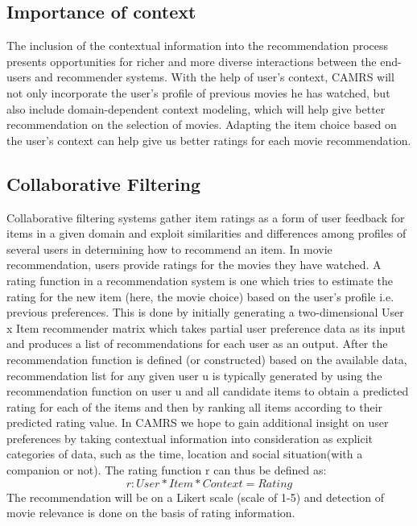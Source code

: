 \documentclass{article}
\begin{document}
\subsection{Importance of context} 
The inclusion of the contextual information into the recommendation process presents opportunities for richer and more diverse interactions between the end-users and recommender systems. With the help of user's context, CAMRS will not only incorporate the user's profile of previous movies he has watched, but also include domain-dependent context modeling, which will help give better recommendation on the selection of movies.  Adapting the item choice based on the user's context can help give us better ratings for each movie recommendation.

\subsection{Collaborative Filtering}
Collaborative filtering systems gather item ratings as a form of user feedback for items in a given domain and exploit similarities and differences among profiles of several users in determining how to recommend an item. In movie recommendation, users provide ratings for the movies they have watched. 
A rating function in a recommendation system is one which tries to estimate the rating for the new item (here, the movie choice) based on the user's profile i.e. previous preferences.
This is done by initially generating a two-dimensional User x Item recommender matrix which takes partial user preference data as its input and produces a list of recommendations for each user as an output.
After the recommendation function is defined (or constructed) based on the available data, recommendation list for any given user u is typically generated by using the recommendation function on user u and all candidate items to obtain a predicted rating for each of the items and then by ranking all items according to their predicted rating value.
In CAMRS we hope to gain additional insight on user preferences by taking contextual information into consideration as explicit categories of data, such as the time, location and social situation(with a companion or not). The rating function r can thus be defined as: 
\begin{equation}r: User * Item * Context = Rating 
\end{equation}
The recommendation will be on a Likert scale (scale of 1-5) and detection of movie relevance is done on the basis of rating information. 
\end{document}

